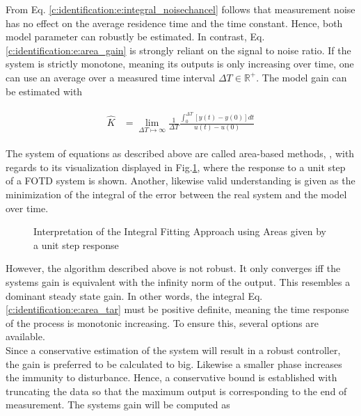 From Eq. \ref{c:identification:e:integral_noisechancel} follows that measurement noise has no effect on the average residence time and the time constant. Hence, both model parameter can robustly be estimated. In contrast, Eq.\ref{c:identification:e:area_gain} is strongly reliant on the signal to noise ratio. If the system is strictly monotone, meaning its outputs is only increasing over time, one can use an average over a measured time interval $\Delta T \in \mathbb{R}^+$. The model gain can be estimated with

\begin{align}
\begin{split}
\hat{K} &= \lim_{\Delta T\mapsto \infty} \frac{1}{\Delta T} \frac{\int_{0}^{\Delta T} \left[ y \left( t\right) - y\left(0\right)\right] dt}{u \left( t \right)-u \left( 0 \right)}
\end{split}
\label{c:identification:e:area_averagegain}
\end{align}

The system of equations as described above are called area-based methods, \cite{Fedele2009a}, with regards to its visualization displayed in Fig.\ref{c:identification:f:Area}, where the response to a unit step of a FOTD system is shown. Another, likewise valid understanding is given as the minimization of the integral of the error between the real system and the model over time.\\

\begin{figure}[H]\centering

\caption{Interpretation of the Integral Fitting Approach using Areas given by a unit step response}
\label{c:identification:f:Area}
\end{figure}

However, the algorithm described above is not robust. It only converges iff the systems gain is equivalent with the infinity norm of the output. This resembles a dominant steady state gain. In other words, the integral Eq. \ref{c:identification:e:area_tar} must be positive definite, meaning the time response of the process is monotonic increasing. To ensure this, several options are available. \\

Since a conservative estimation of the system will result in a robust controller, the gain is preferred to be calculated to big. Likewise a smaller phase increases the immunity to disturbance. Hence, a conservative bound is established with truncating the data so that the maximum output is corresponding to the end of measurement. The systems gain will be computed as

